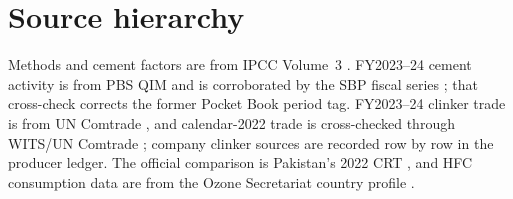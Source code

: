 \section{Source hierarchy}

Methods and cement factors are from IPCC Volume~3 \citep{ipcc2006ippu}. FY2023--24 cement
activity is from PBS QIM \citep{pbsqim2024} and is corroborated by the SBP fiscal series
\citep{sbpstatsupp2024}; that cross-check corrects the former Pocket Book period tag.
FY2023--24 clinker trade is from UN Comtrade \citep{uncomtrade2024clinker}, and calendar-2022
trade is cross-checked through WITS/UN Comtrade \citep{witsclinker2022}; company clinker
sources are recorded row by row in the producer ledger.
The official comparison is Pakistan's 2022 CRT
\citep{pakcrt2026}, and HFC consumption data are from the Ozone Secretariat country profile
\citep{pakistanozoneprofile}.
